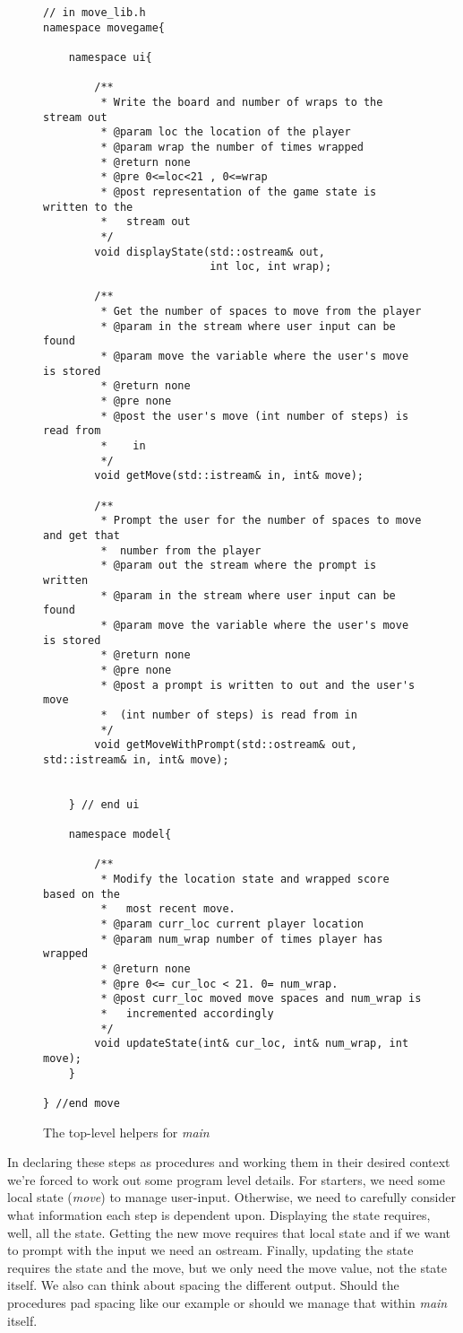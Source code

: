 \documentclass[nobib]{tufte-handout}
\begin{document}
\begin{figure}[!htbp]
\begin{lstlisting}
// in move_lib.h
namespace movegame{

	namespace ui{
		
		/**
		 * Write the board and number of wraps to the stream out
		 * @param loc the location of the player
		 * @param wrap the number of times wrapped
		 * @return none
		 * @pre 0<=loc<21 , 0<=wrap
		 * @post representation of the game state is written to the
		 *   stream out
		 */
		void displayState(std::ostream& out,
						  int loc, int wrap);

		/**
		 * Get the number of spaces to move from the player
		 * @param in the stream where user input can be found
		 * @param move the variable where the user's move is stored
		 * @return none
		 * @pre none
		 * @post the user's move (int number of steps) is read from
		 *    in
		 */						  
		void getMove(std::istream& in, int& move);		
		
		/**
		 * Prompt the user for the number of spaces to move and get that 
		 *  number from the player 
		 * @param out the stream where the prompt is written
		 * @param in the stream where user input can be found
		 * @param move the variable where the user's move is stored
		 * @return none
		 * @pre none
		 * @post a prompt is written to out and the user's move 
		 *  (int number of steps) is read from in
		 */						  
		void getMoveWithPrompt(std::ostream& out, std::istream& in, int& move);		
	
	
	} // end ui

	namespace model{
	
		/**
		 * Modify the location state and wrapped score based on the 
		 *   most recent move.
		 * @param curr_loc current player location
		 * @param num_wrap number of times player has wrapped
		 * @return none
		 * @pre 0<= cur_loc < 21. 0= num_wrap. 
		 * @post curr_loc moved move spaces and num_wrap is 
		 *   incremented accordingly 
		 */
		void updateState(int& cur_loc, int& num_wrap, int move);
	}

} //end move

\end{lstlisting}
\caption{The top-level helpers for \textit{main}}
\label{fig:top}
\end{figure}

In declaring these steps as procedures and working them in their desired context we're forced to work out some program level details. For starters, we need some local state (\textit{move}) to manage user-input. Otherwise, we need to carefully consider what information each step is dependent upon. Displaying the state requires, well, all the state. Getting the new move requires that local state and if we want to prompt with the input we need an ostream. Finally, updating the state requires the state and the move, but we only need the move value, not the state itself. We also can think about spacing the different output. Should the procedures pad spacing like our example or should we manage that within \textit{main} itself.
\end{document}
